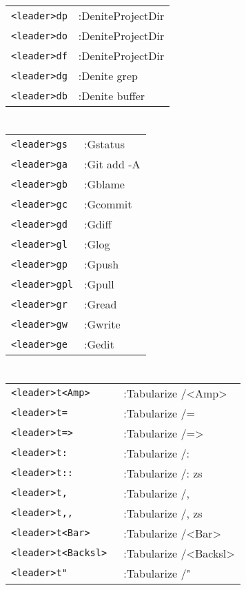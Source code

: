\begin{multicols}{3}
\section{}
\begin{tabular}{@{}ll@{}}
	\verb!<leader>dp! & :DeniteProjectDir \\
	\verb!<leader>do! & :DeniteProjectDir \\
	\verb!<leader>df! & :DeniteProjectDir \\
	\verb!<leader>dg! & :Denite grep \\
	\verb!<leader>db! & :Denite buffer \\
\end{tabular}

\section{}
\begin{tabular}{@{}ll@{}}
	\verb!<leader>gs! & :Gstatus \\
	\verb!<leader>ga! & :Git add -A \\
	\verb!<leader>gb! & :Gblame \\
	\verb!<leader>gc! & :Gcommit \\
	\verb!<leader>gd! & :Gdiff \\
	\verb!<leader>gl! & :Glog \\
	\verb!<leader>gp! & :Gpush \\
	\verb!<leader>gpl! & :Gpull  \\
	\verb!<leader>gr! & :Gread \\
	\verb!<leader>gw! & :Gwrite \\
	\verb!<leader>ge! & :Gedit \\
\end{tabular}

\section{}
\begin{tabular}{@{}ll@{}}
	\verb!<leader>t<Amp> ! & :Tabularize  /<Amp> \\
	\verb!<leader>t= ! & :Tabularize  /= \\
	\verb!<leader>t=>! & :Tabularize  /=> \\
	\verb!<leader>t: ! & :Tabularize  /: \\
	\verb!<leader>t::! & :Tabularize  /: zs \\
	\verb!<leader>t, ! & :Tabularize  /, \\
	\verb!<leader>t,,! & :Tabularize  /, zs \\
	\verb!<leader>t<Bar>! & :Tabularize  /<Bar> \\
	\verb!<leader>t<Backsl> ! & :Tabularize  /<Backsl> \\
	\verb!<leader>t" ! & :Tabularize  /" \\
\end{tabular}


\end{multicols}
